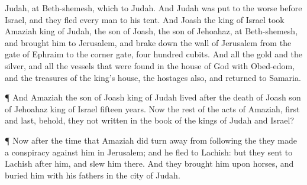 {Judah, at
Beth-shemesh, which
{} to
Judah.
And
Judah was put to the
worse
before
Israel, and they
fled every
man to his
tent.
And
Joash the
king of
Israel
took
Amaziah
king of
Judah, the
son of
Joash, the
son of
Jehoahaz, at
Beth-shemesh, and
brought him to
Jerusalem, and brake
down the
wall of
Jerusalem from the
gate of
Ephraim to the
corner
gate,
four
hundred
cubits.
And
{} all the
gold and the
silver, and all the
vessels that were
found in the
house of
God with
Obed-edom, and the
treasures of the
king’s
house, the
hostages also, and
returned to
Samaria.
\par }{\PP {}¶ And
Amaziah the
son of
Joash
king of
Judah
lived
after the
death of
Joash
son of
Jehoahaz
king of
Israel
fifteen
years.
Now the
rest of the
acts of
Amaziah,
first and
last, behold,
{} they not
written in the
book of the
kings of
Judah and
Israel?
\par }{\PP {}¶ Now after the
time that
Amaziah did turn
away from
following the
{} they
made a
conspiracy against him in
Jerusalem; and he
fled to
Lachish: but they
sent to
Lachish
after him, and
slew him there.
And they
brought him upon
horses, and
buried him with his
fathers in the
city of
Judah.

}
